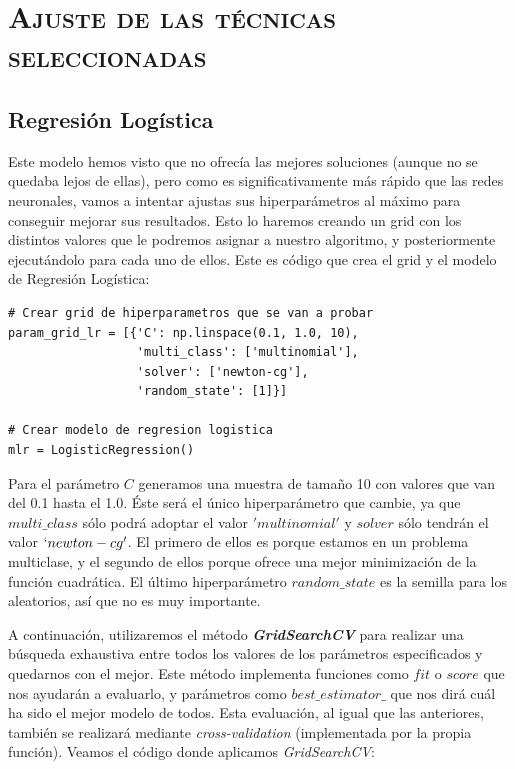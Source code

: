 \documentclass[11pt,a4paper]{article}
\begin{document}
\section{\textsc{Ajuste de las técnicas seleccionadas}}

\subsection{Regresión Logística}

Este modelo hemos visto que no ofrecía las mejores soluciones (aunque no se quedaba lejos de ellas), pero como es significativamente más
rápido que las redes neuronales, vamos a intentar ajustas sus hiperparámetros al máximo para conseguir mejorar sus resultados. Esto lo
haremos creando un grid con los distintos valores que le podremos asignar a nuestro algoritmo, y posteriormente ejecutándolo para cada uno
de ellos. Este es código que crea el grid y el modelo de Regresión Logística:

\begin{lstlisting}
# Crear grid de hiperparametros que se van a probar
param_grid_lr = [{'C': np.linspace(0.1, 1.0, 10),
                  'multi_class': ['multinomial'],
                  'solver': ['newton-cg'],
                  'random_state': [1]}]

# Crear modelo de regresion logistica
mlr = LogisticRegression()
\end{lstlisting}

Para el parámetro $C$ generamos una muestra de tamaño 10 con valores que van del 0.1 hasta el 1.0. Éste será el único hiperparámetro que
cambie, ya que $multi\_class$ sólo podrá adoptar el valor $'multinomial'$ y $solver$ sólo tendrán el valor $`newton-cg'$. El primero de
ellos es porque estamos en un problema multiclase, y el segundo de ellos porque ofrece una mejor minimización de la función cuadrática. El
último hiperparámetro $random\_state$ es la semilla para los aleatorios, así que no es muy importante.

A continuación, utilizaremos el método \textbf{\textit{GridSearchCV}}\cite{GridSearchCV} para realizar una búsqueda exhaustiva entre todos
los valores de los parámetros especificados y quedarnos con el mejor. Este método implementa funciones como $fit$ o $score$ que nos
ayudarán a evaluarlo, y parámetros como $best\_estimator\_$ que nos dirá cuál ha sido el mejor modelo de todos. Esta evaluación, al igual
que las anteriores, también se realizará mediante \textit{cross-validation} (implementada por la propia función). Veamos el código donde
aplicamos \textit{GridSearchCV}:
\end{document}
